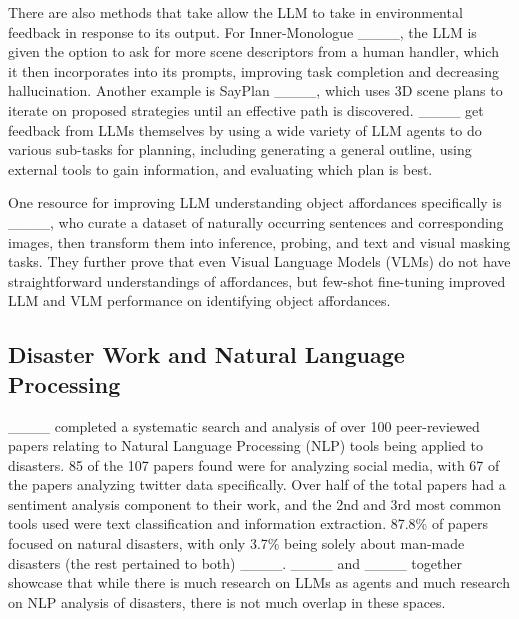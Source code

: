 There are also methods that take allow the LLM to take in environmental feedback in response to its output. For Inner-Monologue ____, the LLM is given the option to ask for more scene descriptors from a human handler, which it then incorporates into its prompts, improving task completion and decreasing hallucination. Another example is SayPlan ____, which uses 3D scene plans to iterate on proposed strategies until an effective path is discovered. ____ get feedback from LLMs themselves by using a wide variety of LLM agents to do various sub-tasks for planning, including generating a general outline, using external tools to gain information, and evaluating which plan is best. 

One resource for improving LLM understanding object affordances specifically is ____, who curate a dataset of naturally occurring sentences and corresponding images, then transform them into inference, probing, and text and visual masking tasks. They further prove that even Visual Language Models (VLMs) do not have straightforward understandings of affordances, but few-shot fine-tuning improved LLM and VLM performance on identifying object affordances.

\subsection{Disaster Work and Natural Language Processing}
____ completed a systematic search and analysis of over 100 peer-reviewed papers relating to Natural Language Processing (NLP) tools being applied to disasters. 85 of the 107 papers found were for analyzing social media, with 67 of the papers analyzing twitter data specifically. Over half of the total papers had a sentiment analysis component to their work, and the 2nd and 3rd most common tools used were text classification and information extraction. 87.8\% of papers focused on natural disasters, with only 3.7\% being solely about man-made disasters (the rest pertained to both) ____. ____ and ____ together showcase that while there is much research on LLMs as agents and much research on NLP analysis of disasters, there is not much overlap in these spaces.